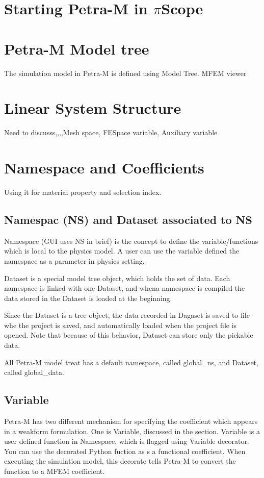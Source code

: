 \documentclass[11pt,a4paper,final]{report}
\begin{document}
\section{Starting Petra-M in  $\pi$Scope}

\section{Petra-M Model tree}
The simulation model in Petra-M is defined using Model Tree. MFEM viewer

\section{Linear System Structure}
Need to discusss,,,,Mesh space, FESpace variable, Auxiliary variable

\section{Namespace and Coefficients}
Using it for material property and selection index.
\subsection{Namespac (NS) and Dataset associated to NS}
Namespace (GUI uses NS in brief) is the concept to define the variable/functions which is local to the physics model. 
A user can use the variable defined the namespace as a parameter in physics setting. 

Dataset is a special model tree object, which holds the set of data. 
Each namespace is linked with one Dataset, and whena namespace is compiled the data stored in the Dataset is loaded at the beginning. 

Since the Dataset is a tree object, the data recorded in Dagaset  is saved to file whe the project is saved, and automatically loaded when the project file is opened.
Note that because of this behavior, Dataset can store only the pickable data. 

All Petra-M model treat has a default namespace, called global\_ns, and Dataset, called global\_data.

\subsection{Variable}
Petra-M has two different mechanism for specifying the coefficient which appears in a weakform formulation. One is Variable, discussed in the section.
Variable is a user defined function in Namespace, which is flagged using Variable decorator.
You can use the decorated Python fuction as s a functional coefficient.
When executing the simulation model, this decorate tells Petra-M to convert the function to a MFEM coefficient. 
\end{document}
